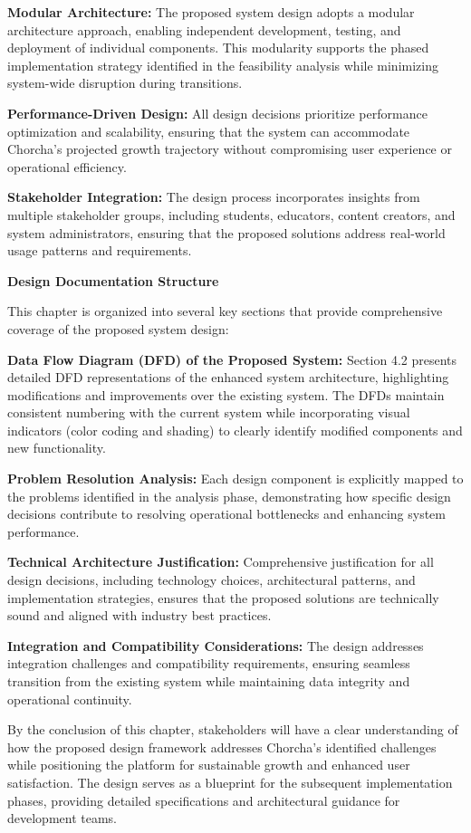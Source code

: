 \documentclass[12pt,a4paper,oneside]{book}
\begin{document}
\textbf{Modular Architecture:} The proposed system design adopts a modular architecture approach, enabling independent development, testing, and deployment of individual components. This modularity supports the phased implementation strategy identified in the feasibility analysis while minimizing system-wide disruption during transitions.

\textbf{Performance-Driven Design:} All design decisions prioritize performance optimization and scalability, ensuring that the system can accommodate Chorcha's projected growth trajectory without compromising user experience or operational efficiency.

\textbf{Stakeholder Integration:} The design process incorporates insights from multiple stakeholder groups, including students, educators, content creators, and system administrators, ensuring that the proposed solutions address real-world usage patterns and requirements.

\textbf{Design Documentation Structure}

This chapter is organized into several key sections that provide comprehensive coverage of the proposed system design:

\textbf{Data Flow Diagram (DFD) of the Proposed System:} Section 4.2 presents detailed DFD representations of the enhanced system architecture, highlighting modifications and improvements over the existing system. The DFDs maintain consistent numbering with the current system while incorporating visual indicators (color coding and shading) to clearly identify modified components and new functionality.

\textbf{Problem Resolution Analysis:} Each design component is explicitly mapped to the problems identified in the analysis phase, demonstrating how specific design decisions contribute to resolving operational bottlenecks and enhancing system performance.

\textbf{Technical Architecture Justification:} Comprehensive justification for all design decisions, including technology choices, architectural patterns, and implementation strategies, ensures that the proposed solutions are technically sound and aligned with industry best practices.

\textbf{Integration and Compatibility Considerations:} The design addresses integration challenges and compatibility requirements, ensuring seamless transition from the existing system while maintaining data integrity and operational continuity.

By the conclusion of this chapter, stakeholders will have a clear understanding of how the proposed design framework addresses Chorcha's identified challenges while positioning the platform for sustainable growth and enhanced user satisfaction. The design serves as a blueprint for the subsequent implementation phases, providing detailed specifications and architectural guidance for development teams.
\end{document}
